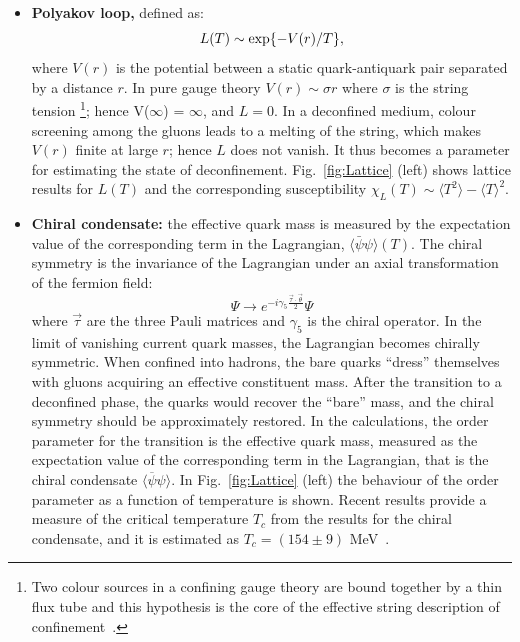 \begin{itemize}
\item \textbf{Polyakov loop,} defined as:
\begin{equation}
L(T)\sim {\rm exp}\{-V(r)/T\},
\end{equation}
where $V(r)$ is the potential between a static quark-antiquark pair separated by a distance $r$. 
In pure gauge theory $V(r)\sim \sigma r$ where $\sigma$ is the string tension \footnote{Two colour sources 
in a confining gauge theory are bound together by a thin flux tube and this hypothesis is the
core of the effective string description of confinement~\cite{Caselle:2002vq}.}; hence V($\infty$) = $\infty$, 
and $L = 0$. In a deconfined medium, colour screening among the gluons leads to a melting of the 
string, which makes $V(r)$ finite at large $r$; hence $L$ does not vanish. It thus 
becomes a parameter for estimating the state of deconfinement. 
Fig.~\ref{fig:Lattice} (left) shows lattice results for $L(T)$ and the 
corresponding susceptibility $\chi_L(T)\sim \langle T^2 \rangle - \langle T \rangle ^2$. 
\item \textbf{Chiral condensate: }the effective quark mass is measured by the expectation value 
of the corresponding term in the Lagrangian, $\langle  \bar{\psi}\psi\rangle (T)$. 
The chiral symmetry is the invariance of the Lagrangian under an axial transformation of the fermion field:
\begin{equation}
\Psi \rightarrow e^{-i \gamma_{5} \frac{\vec{\tau} \cdot \vec{\theta}}{2}}\Psi
\end{equation}
where $\vec{\tau}$ are the three Pauli matrices and $\gamma_5$ 
is the chiral operator. In the limit of 
vanishing current quark masses, the Lagrangian becomes 
chirally symmetric. When confined into 
hadrons, the bare quarks ``dress'' themselves with gluons acquiring 
an effective constituent mass. 
After the transition to a deconfined phase, the quarks 
would recover the ``bare'' mass, and the 
chiral symmetry should be approximately restored. In the calculations, 
the order parameter for the transition is the effective 
quark mass, measured as the expectation value of the corresponding 
term in the Lagrangian, that is the 
chiral condensate $\langle \overline{\psi}\psi \rangle$. In Fig.~\ref{fig:Lattice} 
(left) the behaviour of 
the order parameter as a function of temperature is shown. 
Recent results provide a measure of the critical temperature 
$T_c$ from the results for the chiral condensate, 
and it is estimated as $T_c = (154 \pm 9) $ MeV~\cite{Petreczky:2012rq}.

\end{itemize}

